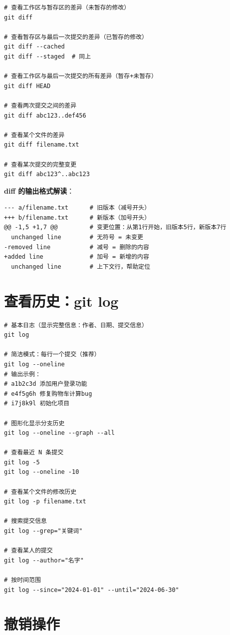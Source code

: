 \documentclass[12pt,a4paper,openany]{ctexbook}
\begin{document}
\begin{lstlisting}[style=shell]
# 查看工作区与暂存区的差异（未暂存的修改）
git diff

# 查看暂存区与最后一次提交的差异（已暂存的修改）
git diff --cached
git diff --staged  # 同上

# 查看工作区与最后一次提交的所有差异（暂存+未暂存）
git diff HEAD

# 查看两次提交之间的差异
git diff abc123..def456

# 查看某个文件的差异
git diff filename.txt

# 查看某次提交的完整变更
git diff abc123^..abc123
\end{lstlisting}

\begin{infobox}
\textbf{diff 的输出格式解读}：
\begin{lstlisting}[style=shellinbox]
--- a/filename.txt      # 旧版本（减号开头）
+++ b/filename.txt      # 新版本（加号开头）
@@ -1,5 +1,7 @@         # 变更位置：从第1行开始，旧版本5行，新版本7行
  unchanged line        # 无符号 = 未变更
-removed line           # 减号 = 删除的内容
+added line             # 加号 = 新增的内容
  unchanged line        # 上下文行，帮助定位
\end{lstlisting}
\end{infobox}

\section{查看历史：git log}

\begin{lstlisting}[style=shell]
# 基本日志（显示完整信息：作者、日期、提交信息）
git log

# 简洁模式：每行一个提交（推荐）
git log --oneline
# 输出示例：
# a1b2c3d 添加用户登录功能
# e4f5g6h 修复购物车计算bug
# i7j8k9l 初始化项目

# 图形化显示分支历史
git log --oneline --graph --all

# 查看最近 N 条提交
git log -5
git log --oneline -10

# 查看某个文件的修改历史
git log -p filename.txt

# 搜索提交信息
git log --grep="关键词"

# 查看某人的提交
git log --author="名字"

# 按时间范围
git log --since="2024-01-01" --until="2024-06-30"
\end{lstlisting}

\section{撤销操作}
\end{document}
